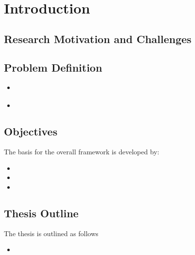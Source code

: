 \chapter{Introduction}\label{chapter:intro}
\setlength{\parindent}{4em}
\setlength{\parskip}{1em}
\section{Research Motivation and Challenges}
\lipsum[3-4]
\section{Problem Definition}
\begin{itemize}
\item \cite{Ref1}
\item \cite{Ref2}
\end{itemize}

\section{Objectives}
The basis for the overall framework is developed by:

\begin{itemize}
    \item 
    \item 
    \item 
\end{itemize}
\section{Thesis Outline}
The thesis is outlined as follows
\begin{itemize}
\item 
\end{itemize}









